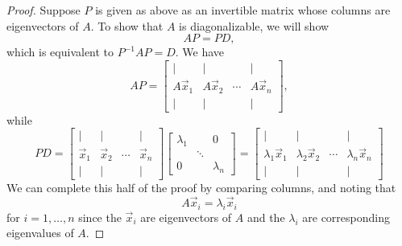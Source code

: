 \documentclass{ximera}
\begin{document}
\begin{proof}
Suppose $P$ is given as above as an invertible matrix whose columns are eigenvectors of $A$. To show that $A$ is diagonalizable, we will show 
$$AP=PD,$$
which is equivalent to $P^{-1}AP=D$.  We have
$$AP=\begin{bmatrix}
| & | &   & | \\
A\vec{x}_1 & A\vec{x}_2  & \cdots & A\vec{x}_n \\
| & | &   & |
\end{bmatrix},$$
while
\begin{equation*}
PD=\begin{bmatrix}
| & | &   & | \\
\vec{x}_1 & \vec{x}_2  & \cdots & \vec{x}_n \\
| & | &   & |
\end{bmatrix} 
\begin{bmatrix}
\lambda _{1} &  & 0 \\
& \ddots &  \\
0 &  & \lambda _{n}
\end{bmatrix}=\begin{bmatrix}
| & | &   & | \\
\lambda _{1}\vec{x}_1 & \lambda _{2}\vec{x}_2 & \cdots & \lambda_{n}\vec{x}_n \\
| & | &   & | 
\end{bmatrix}
\end{equation*}
We can complete this half of the proof by comparing columns, and noting that 
\begin{equation}
A \vec{x}_i = \lambda_i \vec{x}_i 
\end{equation}
for $i=1,\ldots,n$ since the $ \vec{x}_i$ are eigenvectors of $A$ and the $\lambda_i$ are corresponding eigenvalues of $A$.


\end{proof}
\end{document}
